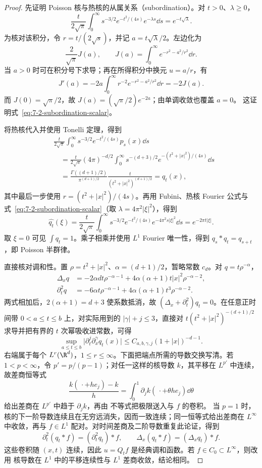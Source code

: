 \begin{proof}
先证明 Poisson 核与热核的从属关系（subordination）。对 $t>0$、$\lambda\geq0$，
\begin{equation}\label{eq:7-2-subordination-scalar}
 \frac{t}{2\sqrt\pi}\int_0^\infty
 s^{-3/2}e^{-t^2/(4s)}e^{-\lambda s}\dd s=e^{-t\sqrt\lambda}.
\end{equation}
为核对该积分，令 $r=t/(2\sqrt s)$，并记
$a=t\sqrt\lambda/2$。左边化为
\[
 \frac2{\sqrt\pi}J(a),
 \qquad J(a)=\int_0^\infty e^{-r^2-a^2/r^2}\dd r.
\]
当 $a>0$ 时可在积分号下求导；再在所得积分中换元 $u=a/r$，有
\[
 J'(a)=-2a\int_0^\infty r^{-2}e^{-r^2-a^2/r^2}\dd r=-2J(a).
\]
而 $J(0)=\sqrt\pi/2$，故 $J(a)=(\sqrt\pi/2)e^{-2a}$；由单调收敛也覆盖 $a=0$。
这证明式~\eqref{eq:7-2-subordination-scalar}。

将热核代入并使用 Tonelli 定理，得到
\begin{align*}
 &\frac{t}{2\sqrt\pi}\int_0^\infty
  s^{-3/2}e^{-t^2/(4s)}p_s(x)\dd s\\
 &\quad=\frac{t}{2\sqrt\pi}(4\pi)^{-d/2}
  \int_0^\infty s^{-(d+3)/2}
  e^{-(t^2+|x|^2)/(4s)}\dd s\\
 &\quad=\frac{\Gamma((d+1)/2)}{\pi^{(d+1)/2}}
       \frac{t}{(t^2+|x|^2)^{(d+1)/2}}=q_t(x),
\end{align*}
其中最后一步使用 $r=(t^2+|x|^2)/(4s)$。再用 Fubini、热核 Fourier 公式与
式~\eqref{eq:7-2-subordination-scalar}（取 $\lambda=4\pi^2|\xi|^2$），得到
\[
 \widehat{q_t}(\xi)
 =\frac{t}{2\sqrt\pi}\int_0^\infty
 s^{-3/2}e^{-t^2/(4s)}e^{-4\pi^2s|\xi|^2}\dd s
 =e^{-2\pi t|\xi|}.
\]
取 $\xi=0$ 可见 $\int q_t=1$。乘子相乘并使用 $L^1$ Fourier 唯一性，得到
$q_s*q_t=q_{s+t}$，即 Poisson 半群律。

直接核对调和性。置 $\rho=t^2+|x|^2$、$\alpha=(d+1)/2$，暂略常数 $c_d$。对
$q=t\rho^{-\alpha}$，
\begin{align*}
 \Delta_xq
 &=-2\alpha dt\rho^{-\alpha-1}
   +4\alpha(\alpha+1)t|x|^2\rho^{-\alpha-2},\\
 \partial_t^2q
 &=-6\alpha t\rho^{-\alpha-1}
   +4\alpha(\alpha+1)t^3\rho^{-\alpha-2}.
\end{align*}
两式相加后，$2(\alpha+1)=d+3$ 使系数抵消，故
$(\Delta_x+\partial_t^2)q_t=0$。在任意正时间带
$0<a\leq t\leq b$ 上，对实际用到的 $|\gamma|+j\leq3$，直接对
$t(t^2+|x|^2)^{-(d+1)/2}$ 求导并把有界的 $t$ 次幂吸收进常数，可得
\[
 \sup_{a\leq t\leq b}
 \bigl|\partial_t^j\partial_x^\gamma q_t(x)\bigr|
 \leq C_{a,b,\gamma,j}(1+|x|)^{-d-1}.
\]
右端属于每个 $L^r(\R^d)$，$1\leq r\leq\infty$。下面把端点所需的导数交换写清。若
$1<p<\infty$，令 $p'=p/(p-1)$；对任一这样的核导数 $k$，其平移在 $L^{p'}$ 中连续，故差商恒等式
\[
 \frac{k(\,\cdot+h e_j)-k}{h}
 =\int_0^1\partial_jk(\,\cdot+\theta h e_j)\dd\theta
\]
给出差商在 $L^{p'}$ 中趋于 $\partial_jk$，再由 \Holder{} 不等式把极限送入与 $f$ 的卷积。
当 $p=1$ 时，核的下一阶导数连续且在无穷远消失，因而一致连续；同一恒等式给出差商在
$L^\infty$ 中收敛，再与 $f\in L^1$ 配对。对时间差商及二阶导数重复此论证，得到
\[
 \partial_t^2(q_t*f)=(\partial_t^2q_t)*f,
 \qquad \Delta_x(q_t*f)=(\Delta_xq_t)*f.
\]
这些卷积随 $(x,t)$ 连续，因此 $u=Q_tf$ 是经典调和函数。若 $f\in C_0\subset L^\infty$，则改用
核导数在 $L^1$ 中的平移连续性与 $L^1$ 差商收敛，结论相同。


\end{proof}
